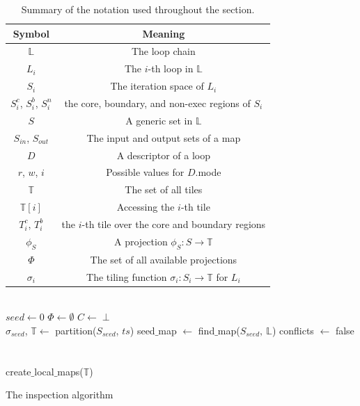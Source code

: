 \begin{table}
\centering
\begin{tabulary}{1.0\columnwidth}{C|C}
\hline
Symbol & Meaning \\
\hline
$\mathbb{L}$ & The loop chain \\
$L_i$ & The $i$-th loop in $\mathbb{L}$ \\ 
$S_i$ & The iteration space of $L_i$ \\
$S_i^{c}$, $S_i^{b}$, $S_i^{n}$ & the core, boundary, and non-exec regions of $S_i$ \\ 
$S$ & A generic set in $\mathbb{L}$ \\
$S_{in}$, $S_{out}$ & The input and output sets of a map \\
$D$ & A descriptor of a loop \\
$r$, $w$, $i$ & Possible values for $D$.mode \\
$\mathbb{T}$ & The set of all tiles \\
$\mathbb{T}[i]$ & Accessing the $i$-th tile \\
$T_i^{c}$, $T_i^{b}$ & the $i$-th tile over the core and boundary regions \\
$\phi_S$ & A projection $\phi_S : S \rightarrow \mathbb{T}$ \\
$\Phi$ & The set of all available projections \\
$\sigma_i$ & The tiling function $\sigma_i : S_i \rightarrow \mathbb{T}$ for $L_i$ \\
\hline
\end{tabulary}
\caption{Summary of the notation used throughout the section.}
\label{table:st-summary-notation}
\end{table}

\setcounter{algocf}{0}%
\begin{algorithm}[t]
\nonl ~\\
$seed \gets 0$\;
$\Phi \gets \emptyset$\;
$C \gets \perp$\;
\nonl ~\\
$\sigma_{seed}$, $\mathbb{T} \gets$ partition($S_{seed}$, $ts$)\;
seed$\_$map $\gets$ find$\_$map($S_{seed},\ \mathbb{L}$)\;
conflicts $\gets$ false\;
\nonl ~\\
\nonl ~\\
create$\_$local$\_$maps($\mathbb{T}$)\;
\caption{The inspection algorithm}
\label{algo:st-inspector}
\end{algorithm}




